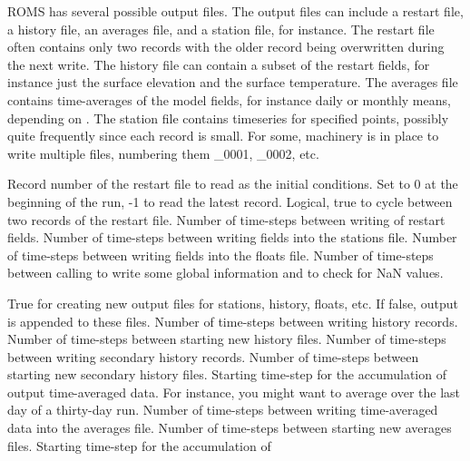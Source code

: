 \begin{klist}
   ROMS has several possible output files. The output files can
   include a restart file, a history file, an averages file, and a
   station file, for instance.  The restart file often contains
   only two records with the older record being overwritten during
   the next write.  The history file can contain a subset of the
   restart fields, for instance just the surface elevation and the
   surface temperature.  The averages file contains time-averages
   of the model fields, for instance daily or monthly means,
   depending on .  The station file contains timeseries
   for specified points, possibly quite frequently since each record
   is small. For some, machinery is in place to write multiple
   files, numbering them \_0001, \_0002, etc.
     \begin{klist}
            Record number of the restart file to read
     as the initial conditions. Set to 0 at the beginning of the
     run, -1 to read the latest record.
        Logical, true to cycle between two records
     of the restart file.
             Number of time-steps between writing of
     restart fields.
             Number of time-steps between writing fields
     into the stations file.
             Number of time-steps between writing fields
     into the floats file.
            Number of time-steps between calling
        to write some global information and to check for
       NaN values. 
     \end{klist}
    \mbox{}
     \begin{klist}
        True for creating new output files for
     stations, history, floats, etc. If false, output is appended
     to these files.
         Number of time-steps between writing history
     records.
         Number of time-steps between starting new history
     files.
         Number of time-steps between writing secondary
     history records.
         Number of time-steps between starting new
     secondary history files.
           Starting time-step for the accumulation of
     output time-averaged data.  For instance, you might want to average
     over the last day of a thirty-day run.
             Number of time-steps between writing
     time-averaged data into the averages file.
             Number of time-steps between starting
     new averages files.
           Starting time-step for the accumulation of

\end{klist}
\end{klist}
